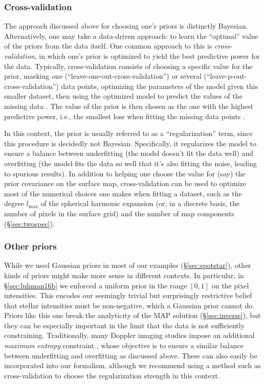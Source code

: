 \documentclass[modern]{aastex631}
\begin{document}
\subsubsection{Cross-validation}
\label{sec:discussion:priors:crossval}
%
The approach discussed above for choosing one's priors is distinctly Bayesian.
Alternatively, one may take a data-driven approach: to learn the ``optimal'' value of the priors from the data itself.
One common approach to this is \emph{cross-validation}, in which one's prior is optimized to yield the best predictive power for the data.
Typically, cross-validation consists of choosing a specific value for the prior, masking one (``leave-one-out-cross-validation'') or several (``leave-p-out-cross-validation'') data points, optimizing the parameters of the model given this smaller dataset, then using the optimized model to predict the values of the missing data \citep[e.g.,][]{Stone1974}.
The value of the prior is then chosen as the one with the highest predictive power, i.e., the smallest loss when fitting the missing data points \citep[for an example of this, see \S 3.7 in][]{Luger2018}.

In this context, the prior is usually referred to as a ``regularization'' term, since this procedure is decidedly not Bayesian.
Specifically, it regularizes the model to ensure a balance between underfitting (the model doesn't fit the data well) and overfitting (the model fits the data so well that it's also fitting the noise, leading to spurious results).
In addition to helping one choose the value for (say) the prior covariance on the surface map, cross-validation can be used to optimize most of the numerical choices one makes when fitting a dataset, such as the degree $l_\mathrm{max}$ of the spherical harmonic expansion (or, in a discrete basis, the number of pixels in the surface grid) and the number of map components (\S\ref{sec:twospec}).

\subsubsection{Other priors}
\label{sec:discussion:priors:nongaussian}

While we used Gaussian priors in most of our examples (\S\ref{sec:spotstar}), other kinds of priors might make more sense in different contexts. 
In particular, in \S\ref{sec:luhman16b} we enforced a uniform prior in the range $[0, 1]$ on the pixel intensities. 
This encodes our seemingly trivial but surprisingly restrictive \citep[see][]{Fienup1982} belief that stellar intensities must be non-negative, which a Gaussian prior cannot do.
Priors like this one break the analyticity of the MAP solution (\S\ref{sec:inverse}), but they can be especially important in the limit that the data is not sufficiently constraining.
Traditionally, many Doppler imaging studies impose an additional \emph{maximum entropy} constraint \citep{Vogt1987}, whose objective is to ensure a similar balance between underfitting and overfitting as discussed above.
These can also easily be incorporated into our formalism, although we recommend using a method such as cross-validation to choose the regularization strength in this context.
\end{document}

